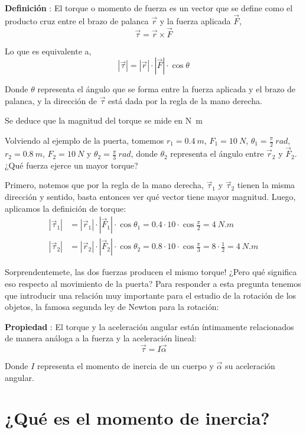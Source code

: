 \documentclass[letterpaper]{article}
\newcounter{propiedades}
\newcounter{definiciones}
\newcommand{\propi}{\stepcounter{propiedades} \textbf{Propiedad \thepropiedades}: }
\newcommand{\defii}{\stepcounter{definiciones} \textbf{Definición \thedefiniciones}: }
\newenvironment{prop}
{ \begin{framed} \propi}
{ \end{framed} }
\newenvironment{defi}{\begin{framed} \defii}{\end{framed}}
\begin{document}
\begin{defi}
El torque o momento de fuerza es un vector que se define como el producto cruz entre el brazo de palanca $\vec{r}$ y la fuerza aplicada $\vec{F}$,
$$\vec{\tau} = \vec{r}\times\vec{F}$$

Lo que es equivalente a,
$$|\vec{\tau}| = |\vec{r}|\cdot|\vec{F}|\cdot\cos{\theta}$$

Donde $\theta$ representa el ángulo que se forma entre la fuerza aplicada y el brazo de palanca, y la dirección de $\vec{\tau}$ está dada por la regla de la mano derecha.

Se deduce que la magnitud del torque se mide en \si{N.m}
\end{defi}

Volviendo al ejemplo de la puerta, tomemos $r_1 = 0.4\ \si{m}$, $F_1 = 10\ \si{N}$, $\theta_1 = \frac\pi2\ \si{rad}$, $r_2 = 0.8\ \si{m}$, $F_2 = 10\ \si{N}$ y $\theta_2 = \frac\pi3\ \si{rad}$, donde $\theta_2$ representa el ángulo entre $\vec{r}_2$ y $\vec{F}_2$. ¿Qué fuerza ejerce un mayor torque?

Primero, notemos que por la regla de la mano derecha, $\vec{\tau}_1$ y $\vec{\tau}_2$ tienen la misma dirección y sentido, basta entonces ver qué vector tiene mayor magnitud. Luego, aplicamos la definición de torque:
\begin{align*}
|\vec{\tau}_1| &= |\vec{r}_1|\cdot|\vec{F}_1|\cdot\cos{\theta_1} = 0.4 \cdot 10 \cdot \cos{\frac\pi2} = 4\ \si{N.m} \\
|\vec{\tau}_2| &= |\vec{r}_2|\cdot|\vec{F}_2|\cdot\cos{\theta_2} = 0.8 \cdot 10 \cdot \cos{\frac\pi3} = 8\cdot\frac12 = 4\ \si{N.m}
\end{align*}

Sorprendentemete, las dos fuerzas producen el mismo torque! ¿Pero qué significa eso respecto al movimiento de la puerta? Para responder a esta pregunta tenemos que introducir una relación muy importante para el estudio de la rotación de los objetos, la famosa segunda ley de Newton para la rotación:

\begin{prop}
El torque y la aceleración angular están íntimamente relacionados de manera análoga a la fuerza y la aceleración lineal:
$$\vec{\tau} = I\vec{\alpha}$$

Donde $I$ representa el momento de inercia de un cuerpo y $\vec{\alpha}$ su aceleración angular.
\end{prop}

\section*{¿Qué es el momento de inercia?}
\end{document}
